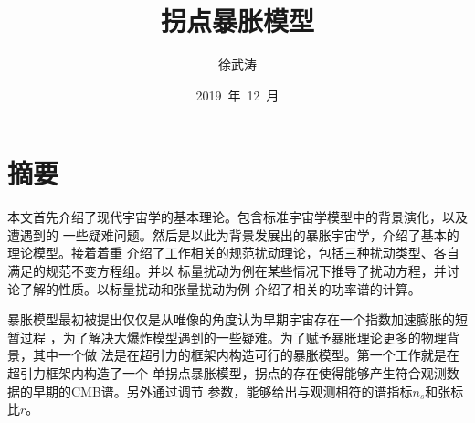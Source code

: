 \confidential{}%
\title{拐点暴胀模型}%
\author{徐武涛}%
\advisors{}%
\date{2019~年~12~月}%
\maketitle%
\MAKETITLE%
\makedeclaration%
\intobmk\chapter*{摘\quad 要}%
\setcounter{page}{1}%


本文首先介绍了现代宇宙学的基本理论。包含标准宇宙学模型中的背景演化，以及遭遇到的
一些疑难问题。然后是以此为背景发展出的暴胀宇宙学，介绍了基本的理论模型。接着着重
介绍了工作相关的规范扰动理论，包括三种扰动类型、各自满足的规范不变方程组。并以
标量扰动为例在某些情况下推导了扰动方程，并讨论了解的性质。以标量扰动和张量扰动为例
介绍了相关的功率谱的计算。

暴胀模型最初被提出仅仅是从唯像的角度认为早期宇宙存在一个指数加速膨胀的短暂过程
，为了解决大爆炸模型遇到的一些疑难。为了赋予暴胀理论更多的物理背景，其中一个做
法是在超引力的框架内构造可行的暴胀模型。第一个工作就是在超引力框架内构造了一个
单拐点暴胀模型，拐点的存在使得能够产生符合观测数据的早期的CMB谱。另外通过调节
参数，能够给出与观测相符的谱指标$n_{s}$和张标比$r$。

